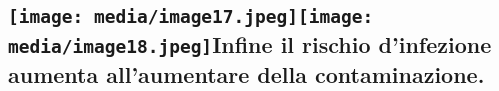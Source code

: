 \documentclass[]{article}
\begin{document}
\subsection{\texorpdfstring{\protect\texttt{[image: media/image17.jpeg]}\protect\texttt{[image: media/image18.jpeg]}Infine
il rischio d'infezione aumenta all'aumentare della
contaminazione.}{Infine il rischio d'infezione aumenta all'aumentare della contaminazione.}}\label{infine-il-rischio-dinfezione-aumenta-allaumentare-della-contaminazione.}

\subsection{}\label{section-9}

\subsection{}\label{section-10}
\end{document}
